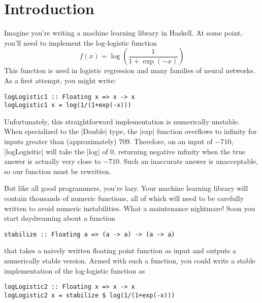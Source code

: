 \documentclass[preprint]{sigplanconf}
\theoremstyle{definition}
\begin{document}



\section{Introduction}

Imagine you're writing a machine learning library in Haskell.
At some point, you'll need to implement the log-logistic function
\begin{equation}
f(x) = \log\left(\frac{1}{1+\exp{(-x)}}\right)
\label{eq:log-logistic}
\end{equation}
This function is used in logistic regression and many families of neural networks.
As a first attempt, you might write:
\begin{lstlisting}
logLogistic1 :: Floating x => x -> x
logLogistic1 x = log(1/(1+exp(-x)))
\end{lstlisting}
Unfortunately, this straightforward implementation is numerically unstable.
When specialized to the |Double| type,
the |exp| function overflows to infinity for inputs greater than (approximately) $709$.
Therefore, on an input of $-710$,
|logLogisitic| will take the |log| of 0,
returning negative infinity when the true answer is actually very close to $-710$.
Such an inaccurate answer is unacceptable,
so our function must be rewritten.

But like all good programmers, you're lazy.
Your machine learning library will contain thousands of numeric functions,
all of which will need to be carefully written to avoid numeric instabilities.
What a maintenance nightmare!
Soon you start daydreaming about a function
\begin{lstlisting}
stabilize :: Floating a => (a -> a) -> (a -> a)
\end{lstlisting}
that takes a naively written floating point function as input and outputs a numerically stable version.
Armed with such a function, you could write a stable implementation of the log-logistic function as
\begin{lstlisting}
logLogistic2 :: Floating x => x -> x
logLogistic2 x = stabilize $ log(1/(1+exp(-x)))
\end{lstlisting}
\end{document}

